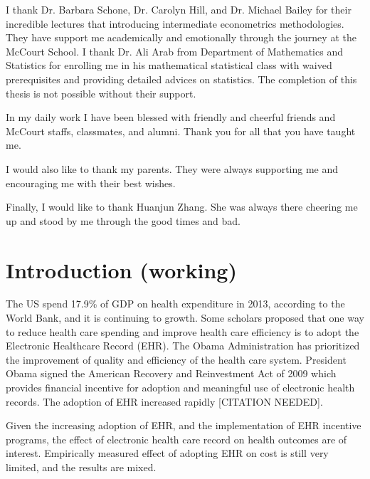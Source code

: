 \documentclass[12pt]{report}
\begin{document}
I thank Dr. Barbara Schone, Dr. Carolyn Hill, and Dr. Michael Bailey for their incredible lectures that introducing intermediate econometrics methodologies. They have support me academically and emotionally through the journey at the McCourt School. I thank Dr. Ali Arab from Department of Mathematics and Statistics for enrolling me in his mathematical statistical class with waived prerequisites and providing detailed advices on statistics. The completion of this thesis is not possible without their support.

In my daily work I have been blessed with friendly and cheerful friends and McCourt staffs, classmates, and alumni. Thank you for all that you have taught me.

I would also like to thank my parents. They were always supporting me and encouraging me with their best wishes.

Finally, I would like to thank Huanjun Zhang. She was always there cheering me up and stood by me through the good times and bad.

\tableofcontents

\listoffigures  %
\listoftables   %

\newpage

\chapter{Introduction (working)}
The US spend 17.9\% of GDP on health expenditure in 2013, according to the World Bank, and it is continuing to growth. Some scholars proposed that one way to reduce health care spending and improve health care efficiency is to adopt the Electronic Healthcare Record (EHR). The Obama Administration has prioritized the improvement of quality and efficiency of the health care system. President Obama signed the American Recovery and Reinvestment Act of 2009 which provides financial incentive for adoption and meaningful use of electronic health records. The adoption of EHR increased rapidly [CITATION NEEDED].

Given the increasing adoption of EHR, and the implementation of EHR incentive programs, the effect of electronic health care record on health outcomes are of interest. Empirically measured effect of adopting EHR on cost is still very limited, and the results are mixed.
\end{document}
